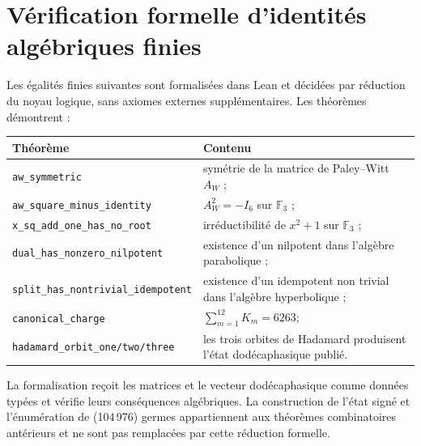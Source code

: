 \chapter{Vérification formelle d'identités algébriques finies}
\label{app:lean}

Les égalités finies suivantes sont formalisées dans Lean et décidées par
réduction du noyau logique, sans axiomes externes supplémentaires. Les théorèmes
démontrent :
\begin{longtable}{p{}p{}}
\toprule
Théorème & Contenu\\
\midrule
\endhead
\texttt{aw\_symmetric}
& symétrie de la matrice de Paley--Witt \(A_W\) ;\\
\texttt{aw\_square\_minus\_identity}
& \(A_W^2=-I_6\) sur \(\mathbb F_3\) ;\\
\texttt{x\_sq\_add\_one\_has\_no\_root}
& irréductibilité de \(x^2+1\) sur \(\mathbb F_3\) ;\\
\texttt{dual\_has\_nonzero\_nilpotent}
& existence d'un nilpotent dans l'algèbre parabolique ;\\
\texttt{split\_has\_nontrivial\_idempotent}
& existence d'un idempotent non trivial dans l'algèbre hyperbolique ;\\
\texttt{canonical\_charge}
& \(\sum_{m=1}^{12}K_m=6263\);\\
\texttt{hadamard\_orbit\_one/two/three}
& les trois orbites de Hadamard produisent l'état dodécaphasique publié.\\
\bottomrule
\end{longtable}

La formalisation reçoit les matrices et le vecteur dodécaphasique comme données
typées et vérifie leurs conséquences algébriques. La construction de l'état
signé et l'énumération de (104\,976) germes appartiennent aux théorèmes
combinatoires antérieurs et ne sont pas remplacées par cette réduction formelle.
